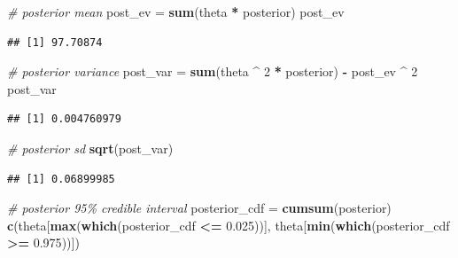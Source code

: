 \documentclass[
]{book}
\newenvironment{Shaded}{\begin{snugshade}}{\end{snugshade}}
\newcommand{\CommentTok}[1]{\textcolor[rgb]{0.56,0.35,0.01}{\textit{#1}}}
\newcommand{\DecValTok}[1]{\textcolor[rgb]{0.00,0.00,0.81}{#1}}
\newcommand{\FloatTok}[1]{\textcolor[rgb]{0.00,0.00,0.81}{#1}}
\newcommand{\KeywordTok}[1]{\textcolor[rgb]{0.13,0.29,0.53}{\textbf{#1}}}
\newcommand{\NormalTok}[1]{#1}
\newcommand{\OperatorTok}[1]{\textcolor[rgb]{0.81,0.36,0.00}{\textbf{#1}}}
\newcommand{\StringTok}[1]{\textcolor[rgb]{0.31,0.60,0.02}{#1}}
\theoremstyle{definition}
\theoremstyle{definition}
\theoremstyle{definition}
\theoremstyle{remark}
\begin{document}
\begin{Shaded}
\begin{Highlighting}[]
\CommentTok{\# posterior mean}
\NormalTok{post\_ev =}\StringTok{ }\KeywordTok{sum}\NormalTok{(theta }\OperatorTok{*}\StringTok{ }\NormalTok{posterior)}
\NormalTok{post\_ev}
\end{Highlighting}
\end{Shaded}

\begin{verbatim}
## [1] 97.70874
\end{verbatim}

\begin{Shaded}
\begin{Highlighting}[]
\CommentTok{\# posterior variance}
\NormalTok{post\_var =}\StringTok{ }\KeywordTok{sum}\NormalTok{(theta }\OperatorTok{\^{}}\StringTok{ }\DecValTok{2} \OperatorTok{*}\StringTok{ }\NormalTok{posterior) }\OperatorTok{{-}}\StringTok{ }\NormalTok{post\_ev }\OperatorTok{\^{}}\StringTok{ }\DecValTok{2}
\NormalTok{post\_var}
\end{Highlighting}
\end{Shaded}

\begin{verbatim}
## [1] 0.004760979
\end{verbatim}

\begin{Shaded}
\begin{Highlighting}[]
\CommentTok{\# posterior sd}
\KeywordTok{sqrt}\NormalTok{(post\_var)}
\end{Highlighting}
\end{Shaded}

\begin{verbatim}
## [1] 0.06899985
\end{verbatim}

\begin{Shaded}
\begin{Highlighting}[]
\CommentTok{\# posterior 95\% credible interval}
\NormalTok{posterior\_cdf =}\StringTok{ }\KeywordTok{cumsum}\NormalTok{(posterior)}
\KeywordTok{c}\NormalTok{(theta[}\KeywordTok{max}\NormalTok{(}\KeywordTok{which}\NormalTok{(posterior\_cdf }\OperatorTok{\textless{}=}\StringTok{ }\FloatTok{0.025}\NormalTok{))], theta[}\KeywordTok{min}\NormalTok{(}\KeywordTok{which}\NormalTok{(posterior\_cdf }\OperatorTok{\textgreater{}=}\StringTok{ }\FloatTok{0.975}\NormalTok{))])}
\end{Highlighting}
\end{Shaded}
\end{document}
